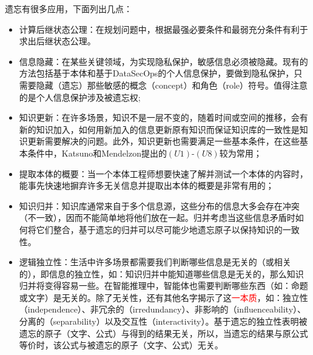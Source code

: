 遗忘有很多应用，下面列出几点：
\begin{itemize}
	\item 计算后继状态公理：在规划问题中，根据最强必要条件和最弱充分条件有利于求出后继状态公理\cite{DBLP:journals/jair/Lin03}。%
	\item 信息隐藏：在某些关键领域，为实现隐私保护，敏感信息必须被隐藏。现有的方法包括基于本体\cite{DBLP:journals/ai/KonevL0W13}和基于DataSecOps的个人信息保护\cite{wangwen2021}，要做到隐私保护，只需要隐藏（遗忘）那些敏感的概念（concept）和角色（role）符号。值得注意的是个人信息保护涉及被遗忘权\cite{zhujia2020};
	\item 知识更新：在许多场景，知识不是一层不变的，随着时间或空间的推移，会有新的知识加入，如何用新加入的信息更新原有知识而保证知识库的一致性是知识更新需要解决的问题。此外，知识更新也需要满足一些基本条件，在这些基本条件中，Katsuno和Mendelzon提出的$(U1)$-$(U8)$较为常用；%
	\item 提取本体的概要：当一个本体工程师想要快速了解并测试一个本体的内容时，能事先快速地摒弃许多无关信息并提取出本体的概要是非常有用的；
	\item 知识归并：知识库通常来自于多个信息源，这些分布的信息大多会存在冲突（不一致），因而不能简单地将他们放在一起。归并考虑当这些信息矛盾时如何将它们整合\cite{DBLP:journals/tkde/LiberatoreS98,DBLP:journals/logcom/KoniecznyP02,DBLP:journals/jair/Maynard-ZhangL03,konieczny2004da2,DBLP:journals/ai/EveraereKM10}，基于遗忘的归并可以尽可能少地遗忘原子以保持知识的一致性\cite{xudai2011}。
	\item 逻辑独立性：生活中许多场景都需要我们判断哪些信息是无关的（或相关的），即信息的独立性\cite{DBLP:journals/jphil/Sandu93,DBLP:journals/igpl/Sandu97,DBLP:journals/igpl/Vaananen02,DBLP:journals/synthese/Sevenster06}，如：知识归并中能知道哪些信息是无关的，那么知识归并将变得容易一些。在智能推理中，智能体也需要判断哪些东西（如：命题或文字）是无关的。除了无关性，还有其他名字揭示了这\textcolor{red}{一本质\cite{bibid}}，如：独立性（independence）、非冗余的（irredundancy）、非影响的（influenceability）、分离的（separability）以及交互性（interactivity）。基于遗忘的独立性表明被遗忘的原子（文字、公式）与得到的结果无关，所以，当遗忘的结果与原公式等价时，该公式与被遗忘的原子（文字、公式）无关\cite{xudai2011}。
\end{itemize}







